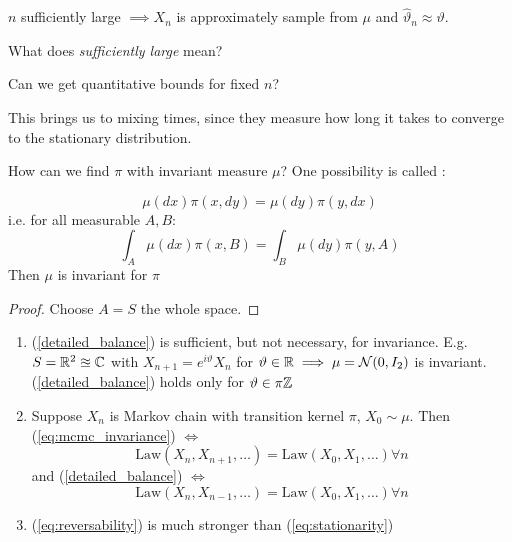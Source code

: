  \(n\) sufficiently large \(\implies X_n\) is approximately sample from \(\mu\) and \(\hat{\vartheta}_n\approx \vartheta\).

 What does \textit{sufficiently large} mean?

Can we get quantitative bounds for fixed \(n\)? 

This brings us to mixing times, since they measure how long it takes to converge to the stationary distribution.

How can we find \(\pi\) with invariant measure \(\mu\)? One possibility is called :

\begin{lemma}\label{lem:1.2} %
    \begin{equation}\label{detailed_balance}\mu(dx)\pi(x,dy)=\mu(dy)\pi(y,dx)\end{equation}
    i.e. for all measurable \(A,B:\) \[\int_A \mu(dx)\pi(x,B)=\int_B \mu(dy)\pi(y,A)\]
    Then \(\mu\) is invariant for \(\pi\)
\end{lemma}

\begin{proof}
    Choose \(A=S\) the whole space.
\end{proof}

\begin{remark}
    \begin{enumerate}
        \item (\ref{detailed_balance}) is sufficient, but not necessary, for invariance. E.g. \(S=\mathbb{R}^2\approxeq \mathbb{C}\) with \(X_{n+1}=e^{i\vartheta}X_n\) for \(\vartheta\in\mathbb{R}\implies \mu=\mathcal{N}(0,I_2)\) is invariant. (\ref{detailed_balance}) holds only for \(\vartheta\in\pi\mathbb{Z}\) 
        \item Suppose \(X_n\) is Markov chain with transition kernel \(\pi\), \(X_0\sim\mu\). Then (\ref{eq:mcmc_invariance}) \(\iff\) \begin{equation}\label{eq:stationarity}
            \text{Law}(X_n,X_{n+1},\dots) =\text{Law}(X_0,X_1,\dots)\forall n
        \end{equation} 
        and (\ref{detailed_balance}) \(\iff\)
        \begin{equation}\label{eq:reversability}
            \text{Law}(X_n,X_{n-1},\dots) =\text{Law}(X_0,X_1,\dots)\forall n
        \end{equation} 
        \item (\ref{eq:reversability}) is much stronger than (\ref{eq:stationarity})
    \end{enumerate}
\end{remark}




